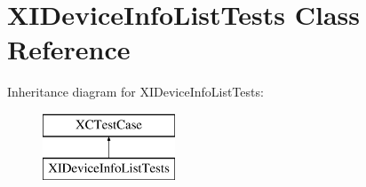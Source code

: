\hypertarget{interface_x_i_device_info_list_tests}{}\section{X\+I\+Device\+Info\+List\+Tests Class Reference}
\label{interface_x_i_device_info_list_tests}
Inheritance diagram for X\+I\+Device\+Info\+List\+Tests\+:\begin{figure}[H]
\begin{center}
\leavevmode
\includegraphics[height=2.000000cm]{interface_x_i_device_info_list_tests}
\end{center}
\end{figure}
